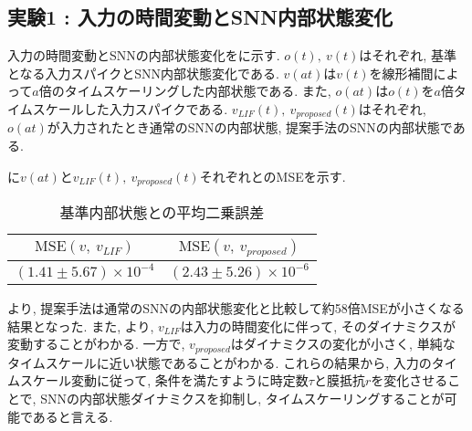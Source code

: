 \makeatletter %
\subsection{実験1 : 入力の時間変動とSNN内部状態変化}

入力の時間変動とSNNの内部状態変化をに示す.
$o(t), ~ v(t)$はそれぞれ, 基準となる入力スパイクとSNN内部状態変化である.
$v(at)$は$v(t)$を線形補間によって$a$倍のタイムスケーリングした内部状態である.
また, $o(at)$は$o(t)$を$a$倍タイムスケールした入力スパイクである.
$v_{LIF}(t),~ v_{proposed}(t)$はそれぞれ, $o(at)$が入力されたとき通常のSNNの内部状態, 提案手法のSNNの内部状態である.

に$v(at)$と$v_{LIF}(t),~ v_{proposed}(t)$それぞれとのMSEを示す.
\begin{table}[htb]
    \centering
    \caption{基準内部状態との平均二乗誤差}
    \label{sec4:tab:exp1}
    \begin{tabular}{cc}
        \hline
        $\mathbf{\mathrm{MSE}(\mathit{v,\ v_{LIF}})}$ & $\mathbf{\mathrm{MSE}(\mathit{v,\ v_{proposed}})}$\\
        \hline
        $(1.41 \pm 5.67) \times 10^{-4}$   & $(2.43\pm 5.26 )\times 10^{-6}$
    \end{tabular}
\end{table}

\textbf{}より, 提案手法は通常のSNNの内部状態変化と比較して約58倍MSEが小さくなる結果となった.
また, \textbf{}より, $v_{LIF}$は入力の時間変化に伴って, そのダイナミクスが変動することがわかる.
一方で, $v_{proposed}$はダイナミクスの変化が小さく, 単純なタイムスケールに近い状態であることがわかる.
これらの結果から, 入力のタイムスケール変動に従って, 条件を満たすように時定数$\tau$と膜抵抗$r$を変化させることで, SNNの内部状態ダイナミクスを抑制し, タイムスケーリングすることが可能であると言える.